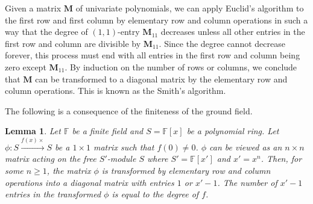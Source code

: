 \documentclass[letterpaper,12pt]{amsart}
\newtheorem{lem}{Lemma}[section]
\theoremstyle{definition} \newtheorem{defn}{Definition}
\theoremstyle{definition} \newtheorem{rem}{Remark}
\theoremstyle{definition} \newtheorem{example}{Example}
\newcommand{\FF}{\mathbb{F}}
\begin{document}
Given a matrix $\mathbf M$ of univariate polynomials, we can apply Euclid's algorithm
to the first row and first column by elementary row and column operations
in such a way that the degree of $(1,1)$-entry $\mathbf M_{11}$ decreases unless all other
entries in the first row and column are divisible by $\mathbf M_{11}$.
Since the degree cannot decrease forever, this process must end
with all entries in the first row and column being zero except $\mathbf M_{11}$.
By induction on the number of rows or columns,
we conclude that $\mathbf M$ can be transformed to a diagonal matrix
by the elementary row and column operations.
This is known as the Smith's algorithm.

The following is a consequence of the finiteness of the ground field.
\begin{lem}
Let $\FF$ be a finite field and $S = \FF[x]$ be a polynomial ring.
Let $\phi : S \xrightarrow{f(x) \times} S$ be a $1 \times 1$ matrix such that $f(0) \ne 0$.
$\phi$ can be viewed as an $n \times n$ matrix acting on the free $S'$-module $S$
where $S' = \FF[x']$ and $x' =x^n$.
Then, for some $n \ge 1$, the matrix $\phi$ is transformed by elementary row and column operations
into a diagonal matrix with entries $1$ or $x'-1$.
The number of $x'-1$ entries in the transformed $\phi$ is equal to the degree of $f$.
\label{lem:coarse-graining-single-polynomial-in-1D}
\end{lem}
\end{document}
